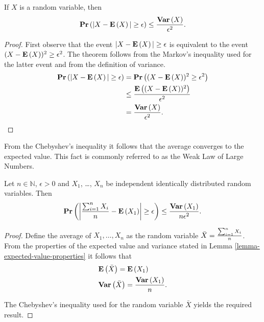 \begin{theorem}
\label{theorem-chebyshev-inequality}
If $X$ is a random variable, then \[ \mathbf{Pr}\left(|X - \mathbf{E}\left(X\right)| \geq \epsilon\right) \leq \frac{\mathbf{Var}\left(X\right)}{\epsilon ^ 2} \text{.} \]
\end{theorem}
\begin{proof}
First observe that the event $|X - \mathbf{E}\left(X\right)| \geq \epsilon$ is equivalent to the event $(X - \mathbf{E}\left(X\right)) ^ 2 \geq \epsilon ^ 2$. The theorem follows from the Markov's inequality used for the latter event and from the definition of variance. 
\[
\begin{split}
\mathbf{Pr}\left(|X - \mathbf{E}\left(X\right)| \geq \epsilon\right) 
	& = \mathbf{Pr}\left((X - \mathbf{E}\left(X\right)) ^ 2 \geq \epsilon ^ 2\right) \\
	& \leq \frac{\mathbf{E}\left((X - \mathbf{E}\left(X\right)) ^ 2\right)}{\epsilon ^ 2} \\
	& = \frac{\mathbf{Var}\left(X\right)}{\epsilon ^ 2} \text{.}
\end{split}
\]
\end{proof}

From the Chebyshev's inequality it follows that the average converges to the expected value. This fact is commonly referred to as the Weak Law of Large Numbers.
\begin{theorem}
\label{theorem-weak-law-of-large-numbers}
Let $n \in \mathbb{N}$, $\epsilon > 0$ and $X_1$, \dots, $X_n$ be independent identically distributed random variables. Then 
\[
\mathbf{Pr}\left(\left| \frac{\sum\displaylimits_{i = 1}^{n} X_i}{n} - \mathbf{E}\left(X_1\right) \right| \geq \epsilon\right) \leq \frac{\mathbf{Var}\left(X_1\right)}{n\epsilon ^ 2} \text{.}
\]
\end{theorem}
\begin{proof}
Define the average of $X_1, \dots, X_n$ as the random variable $\bar{X} = \frac{\sum\displaylimits_{i = 1}^{n} X_i}{n}$. From the properties of the expected value and variance stated in Lemma \ref{lemma-expected-value-properties} it follows that 
\[
\begin{split}
& \mathbf{E}\left(\bar{X}\right) = \mathbf{E}\left(X_1\right) \\
& \mathbf{Var}\left(\bar{X}\right) = \frac{\mathbf{Var}\left(X_1\right)}{n} \text{.}
\end{split}
\]

The Chebyshev's inequality used for the random variable $\bar{X}$ yields the required result.
\end{proof}

